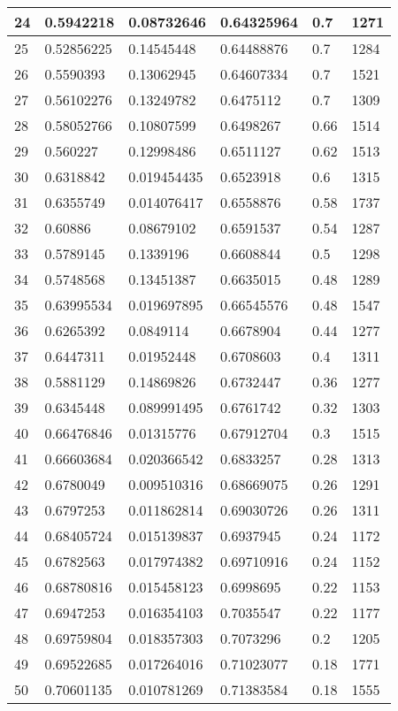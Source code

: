 \begin{longtable}{|l|l|l|l|l|l|}
24 & 0.5942218 & 0.08732646 & 0.64325964 & 0.7 & 1271 \\ \hline 
25 & 0.52856225 & 0.14545448 & 0.64488876 & 0.7 & 1284 \\ \hline 
26 & 0.5590393 & 0.13062945 & 0.64607334 & 0.7 & 1521 \\ \hline 
27 & 0.56102276 & 0.13249782 & 0.6475112 & 0.7 & 1309 \\ \hline 
28 & 0.58052766 & 0.10807599 & 0.6498267 & 0.66 & 1514 \\ \hline 
29 & 0.560227 & 0.12998486 & 0.6511127 & 0.62 & 1513 \\ \hline 
30 & 0.6318842 & 0.019454435 & 0.6523918 & 0.6 & 1315 \\ \hline 
31 & 0.6355749 & 0.014076417 & 0.6558876 & 0.58 & 1737 \\ \hline 
32 & 0.60886 & 0.08679102 & 0.6591537 & 0.54 & 1287 \\ \hline 
33 & 0.5789145 & 0.1339196 & 0.6608844 & 0.5 & 1298 \\ \hline 
34 & 0.5748568 & 0.13451387 & 0.6635015 & 0.48 & 1289 \\ \hline 
35 & 0.63995534 & 0.019697895 & 0.66545576 & 0.48 & 1547 \\ \hline 
36 & 0.6265392 & 0.0849114 & 0.6678904 & 0.44 & 1277 \\ \hline 
37 & 0.6447311 & 0.01952448 & 0.6708603 & 0.4 & 1311 \\ \hline 
38 & 0.5881129 & 0.14869826 & 0.6732447 & 0.36 & 1277 \\ \hline 
39 & 0.6345448 & 0.089991495 & 0.6761742 & 0.32 & 1303 \\ \hline 
40 & 0.66476846 & 0.01315776 & 0.67912704 & 0.3 & 1515 \\ \hline 
41 & 0.66603684 & 0.020366542 & 0.6833257 & 0.28 & 1313 \\ \hline 
42 & 0.6780049 & 0.009510316 & 0.68669075 & 0.26 & 1291 \\ \hline 
43 & 0.6797253 & 0.011862814 & 0.69030726 & 0.26 & 1311 \\ \hline 
44 & 0.68405724 & 0.015139837 & 0.6937945 & 0.24 & 1172 \\ \hline 
45 & 0.6782563 & 0.017974382 & 0.69710916 & 0.24 & 1152 \\ \hline 
46 & 0.68780816 & 0.015458123 & 0.6998695 & 0.22 & 1153 \\ \hline 
47 & 0.6947253 & 0.016354103 & 0.7035547 & 0.22 & 1177 \\ \hline 
48 & 0.69759804 & 0.018357303 & 0.7073296 & 0.2 & 1205 \\ \hline 
49 & 0.69522685 & 0.017264016 & 0.71023077 & 0.18 & 1771 \\ \hline 
50 & 0.70601135 & 0.010781269 & 0.71383584 & 0.18 & 1555 \\ \hline 
\end{longtable}